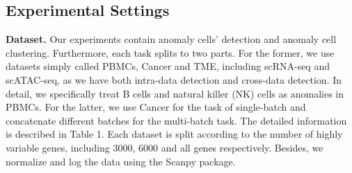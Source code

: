 \documentclass{article}
\begin{document}
\begin{table}
    \centering
    \caption{Average F1*NMI score with standard deviation for fine-grained anomaly detection on single-cell transcriptomics datasets.}
    \label{tab:plain}
\end{table}
\subsection{Experimental Settings}
\textbf{Dataset.}	Our experiments contain anomaly cells’ detection and anomaly cell 
clustering. Furthermore, each task splits to two parts. For the former, we use datasets 
simply called PBMCs, Cancer and TME, including scRNA-seq and scATAC-seq, as we have both 
intra-data detection and cross-data detection. In detail, we specifically treat B cells 
and natural killer (NK) cells as anomalies in PBMCs. For the latter, we use Cancer for 
the task of single-batch and concatenate different batches for the multi-batch task. The 
detailed information is described in Table 1. Each dataset is split according to the 
number of highly variable genes, including 3000, 6000 and all genes respectively. Besides, 
we normalize and log the data using the Scanpy \cite{scanpy} package.
\end{document}
